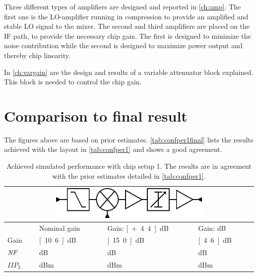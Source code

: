 		Three different types of amplifiers are designed and reported in \autoref{ch:amp}. The first one is the LO-amplifier running in compression to provide an amplified and stable LO signal to the mixer. The second and third amplifiers are placed on the IF path, to provide the necessary chip gain. The first is designed to minimize the noise contribution while the second is designed to maximize power output and thereby chip linearity.

		In \autoref{ch:vargain} are the design and results of a variable attenuator block explained. This block is needed to control the chip gain.

	\newpage
	\section{Comparison to final result}
		The figures above are based on prior estimates. \autoref{tab:confper1final} lists the results achieved with the layout in \autoref{tab:confper1} and shows a good agreement.

		\begin{table}[hpt!]
			\caption[Achieved simulated performance with chip setup 1.]{Achieved simulated performance with chip setup 1. The results are in agreement with the prior estimates detailed in \autoref{tab:confper1}.}
			\label{tab:confper1final}
			\centering
			\begin{tabular}{ l l l l }
				\multicolumn{4}{c}{\includegraphics[width=0.6\textwidth]{fig/system/sys1}} \\\toprule
				& Nominal gain & Gain: \unit[+4.4]{dB} & Gain: \unit[-6]{dB} \\\midrule
				Gain & \unit[10.6]{dB} & \unit[15.0]{dB} & \unit[4.6]{dB} \\
				$\emph{NF}$ & \unit[11]{dB} & \unit[10]{dB} & \unit[13]{dB} \\
				$IIP_3$ & \unit[20]{dBm} & \unit[17]{dBm} & \unit[21]{dBm}  \\\bottomrule
			\end{tabular}
		\end{table}
